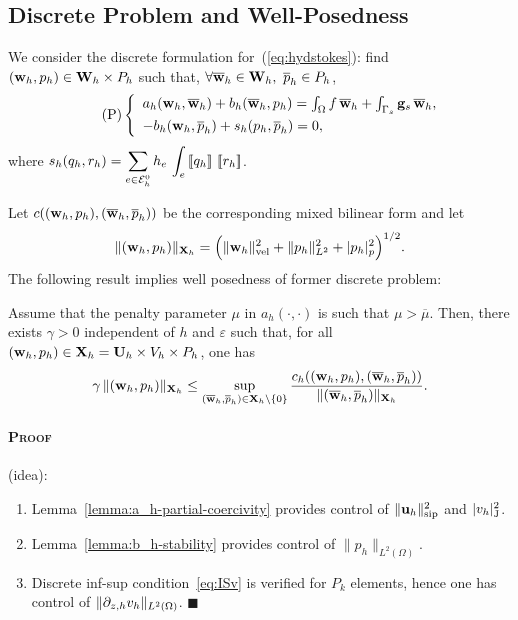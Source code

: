 \documentclass[25pt, a0paper, portrait, leqno, margin=0mm, innermargin=25mm,
blockverticalspace=15mm, colspace=15mm, subcolspace=8mm]{tikzposter}
\begin{document}
{\begin{multicols*}{3}
    \section{\color{colorTwo}Discrete Problem and Well-Posedness \dotfill}

    We consider the discrete formulation for~(\ref{eq:hydstokes}):
    find $(\mathbf{w}_{h}, p_{h}) \in \mathbf{W}_h \times P_h$ such that, $\forall \overline{\mathbf{w}}_h\in\mathbf{W}_h,\ \overline{p}_h\in P_h$,
    \begin{equation}
      \tag{P}
      \label{disc-var-pb}
      \left \{
        \begin{array}{l}
          a_h ( \wh, \bwh) +b_h ( \bwh, \ph ) = \int_{\Omega} f \, \bwh + \int_{\Gamma_s} \gs \, \bwh,
          \\
          \noalign{\smallskip}
          -b_h (\wh, \bph) + s_h (\ph, \bph)=0,
        \end{array} \right.
    \end{equation}
    where
    $s_h (q_{h}, r_h)= \displaystyle \sum_{e\in{\cal E}_h^0} h_e \, \int_e
    \left[\!\left[q_{h}\right]\!\right] \, \left[\!\left[r_h\right]\!\right]$.

    Let $c((\mathbf{w}_{h},p_{h}),(\overline{\mathbf{w}}_h,\overline{p}_h))$ be the corresponding mixed bilinear
    form and let
    $$ \| (\mathbf{w}_{h}, p_{h})\|_{\mathbf{X}_h} = \Big ( \|{\bf w}_h\|_{\mathrm{vel}}^2 + \| p_{h} \|_{L^2}^2 +
    |p_{h}|_p^2\Big ) ^{1/2}.
    $$
    The following result implies well posedness of former
    discrete problem:
    \begin{theorem}
      \label{thm:discrete-inf-sup-stability}
      Assume that the
      penalty parameter $\mu$ in $a_h(\cdot,\cdot)$ is such that
      $ \mu > \overline{\mu}$. Then, there exists $\gamma >0$
      independent of $h$ and $\varepsilon$ such that, for all
      $(\mathbf{w}_{h}, p_{h}) \in \mathbf{X}_h= \mathbf{U}_h\times V_h\times P_h$, one has
      $$
      \gamma \,\| (\mathbf{w}_{h}, p_{h})\|_{\mathbf{X}_h}\le \sup_{(\overline{\mathbf{w}}_h,\overline{p}_h)\in \mathbf{X}_h
        \setminus \{0\}} \frac{c_h ( (\mathbf{w}_{h}, p_{h}), (\overline{\mathbf{w}}_h,\overline{p}_h) )}
      {\|(\overline{\mathbf{w}}_h,\overline{p}_h)\|_{\mathbf{X}_h} }.
      $$
    \end{theorem}
    \paragraph{\textsc{Proof}}(idea):
    \begin{enumerate}
    \item Lemma~\ref{lemma:a_h-partial-coercivity} provides control of
      $\|\mathbf{u}_{h}\|_{\mathrm{sip}}^2$ and $|v_{h}|_{\mathrm{J}}^2$.
    \item Lemma~\ref{lemma:b_h-stability} provides control of
      $\|p_h\|_{L^2(\Omega)}$.
    \item Discrete inf-sup condition~\ref{eq:ISv} is verified for
      $P_k$ elements, hence one has control of
      $\|\partial_{z,h} v_{h}\|_{L^2(\Omega)}$.
     \hfill$\blacksquare$
    \end{enumerate}
  \end{multicols*}
}
\end{document}
